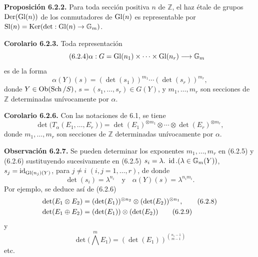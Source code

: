 \textbf{Proposición 6.2.2.} Para toda sección positiva \(n\) de
\(\mathbb Z\), el haz étale de grupos \(\Der(\Gl(n))\) de los conmutadores
de \(\Gl(n)\sisi{)}{}\) es representable por %
\(\operatorname{Sl}(n)=\Ker(\det:\Gl(n)\to\Gm)\).

\textbf{Corolario 6.2.3.} Toda representación
\begin{equation}\tag{6.2.4}
 \alpha:G=\Gl(n_1)\times\cdots\times\Gl(n_r)\longrightarrow\Gm
\end{equation}
es de la forma
\begin{equation}\tag{6.2.5}
 \alpha(Y)(s)=(\det(s_1))^{m_1}\cdots(\det(s_r))^{m_r},
\end{equation}
donde \(Y\in\operatorname{Ob}(\Sch/S)\),
\(s=(s_1,\ldots,s_r)\in G(Y)\), y \(m_1,\ldots,m_r\) son secciones de
\(\mathbb Z\) determinadas unívocamente por \(\alpha\).

\textbf{Corolario 6.2.6.} Con las notaciones de 6.1, se tiene
\begin{equation}\tag{6.2.6}
 \det\bigl(T_\alpha(E_1,\ldots,E_r)\bigr)
 =
 \det(E_1)^{\otimes m_1}\otimes\cdots\otimes
 \det(E_r)^{\otimes m_r},
\end{equation}
donde \(m_1,\ldots,m_r\) son secciones de \(\mathbb Z\) determinadas
unívocamente por \(\alpha\).

\textbf{Observación 6.2.7.} Se pueden determinar los exponentes
\(m_1,\ldots,m_r\) en (6.2.5) y (6.2.6) sustituyendo sucesivamente en
(6.2.5)
\(s_i=\lambda.\ \operatorname{id}.(\lambda\in\Gm(Y))\),
\(s_j=\operatorname{id}_{\Gl(n_j)(Y)}\), para \(j\ne i\)
\((i,j=1,\ldots,r)\), de donde
\[
 \det(s_i)=\lambda^{n_i}\quad\text{y}\quad
 \alpha(Y)(s)=\lambda^{n_im_i}.
\]
Por ejemplo, se deduce así de (6.2.6)
\begin{align}
 \det(\sisi{E_i}{E_1}\otimes E_2)&=(\det(E_1))^{\otimes n_2}\otimes(\det(E_2))^{\otimes n_1}, \tag{6.2.8}\\ %
 \det(E_1\sisi{\otimes}{\oplus} E_2)&=(\det(E_1))\otimes(\det(E_2)) \tag{6.2.9} %
\end{align}
y
\begin{equation}\tag{6.2.10}
 \det\bigl(\bigwedge\limits^m E_1\bigr)=(\det(E_1))^{\binom{n_1-1}{m-1}}
\end{equation}
etc.

